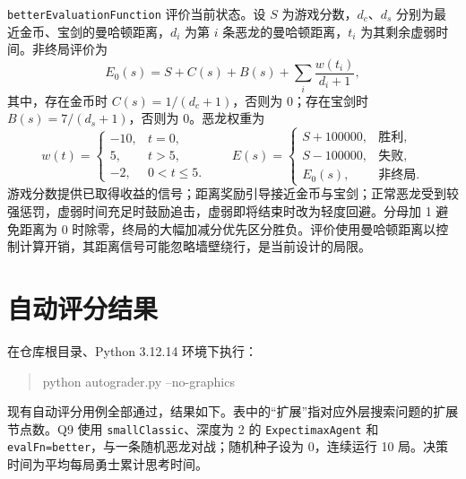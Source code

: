 \documentclass[UTF8,fontset=fandol,a4paper,11pt]{ctexart}
\newcommand{\code}[1]{\texttt{#1}}
\begin{document}
\code{betterEvaluationFunction} 评价当前状态。设 $S$ 为游戏分数，$d_c$、$d_s$ 分别为最近金币、宝剑的曼哈顿距离，$d_i$ 为第 $i$ 条恶龙的曼哈顿距离，$t_i$ 为其剩余虚弱时间。非终局评价为
\[
  E_0(s)=S+C(s)+B(s)+\sum_i\frac{w(t_i)}{d_i+1},
\]
其中，存在金币时 $C(s)=1/(d_c+1)$，否则为 0；存在宝剑时 $B(s)=7/(d_s+1)$，否则为 0。恶龙权重为
\[
  w(t)=
  \begin{cases}
    -10, & t=0,\\
    5, & t>5,\\
    -2, & 0<t\leq5.
  \end{cases}
  \qquad
  E(s)=
  \begin{cases}
    S+100000, & \text{胜利},\\
    S-100000, & \text{失败},\\
    E_0(s), & \text{非终局}.
  \end{cases}
\]
游戏分数提供已取得收益的信号；距离奖励引导接近金币与宝剑；正常恶龙受到较强惩罚，虚弱时间充足时鼓励追击，虚弱即将结束时改为轻度回避。分母加 1 避免距离为 0 时除零，终局的大幅加减分优先区分胜负。评价使用曼哈顿距离以控制计算开销，其距离信号可能忽略墙壁绕行，是当前设计的局限。

\section{自动评分结果}

在仓库根目录、Python 3.12.14 环境下执行：
\begin{quote}
  \small\ttfamily python autograder.py --no-graphics
\end{quote}
现有自动评分用例全部通过，结果如下。表中的“扩展”指对应外层搜索问题的扩展节点数。Q9 使用 \code{smallClassic}、深度为 2 的 \code{ExpectimaxAgent} 和 \code{evalFn=better}，与一条随机恶龙对战；随机种子设为 0，连续运行 10 局。决策时间为平均每局勇士累计思考时间。
\end{document}

